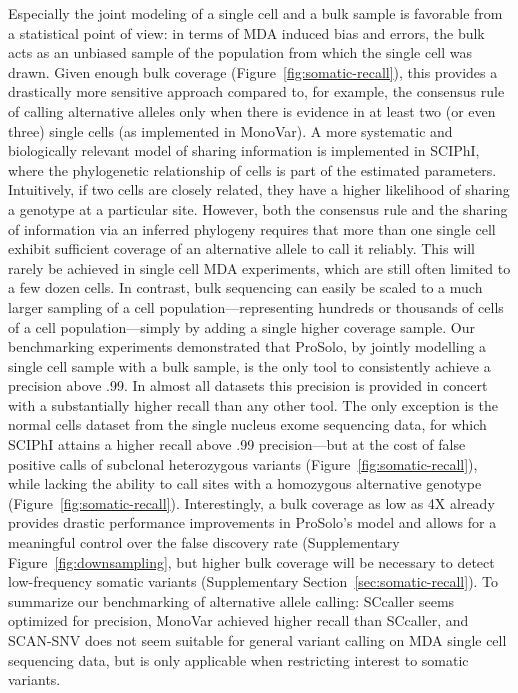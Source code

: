 \documentclass[12pt,inline]{wlscirep}
\begin{document}
Especially the joint modeling of a single cell and a bulk sample is favorable from a statistical point of view: in terms of MDA induced bias and errors, the bulk acts as an unbiased sample of the population from which the single cell was drawn.
Given enough bulk coverage (Figure~\ref{fig:somatic-recall}), this provides a drastically more sensitive approach compared to, for example, the consensus rule of calling alternative alleles only when there is evidence in at least two (or even three) single cells (as implemented in MonoVar\cite{zafar_monovar:_2016}).
A more systematic and biologically relevant model of sharing information is implemented in SCIPhI, where the phylogenetic relationship of cells is part of the estimated parameters.
Intuitively, if two cells are closely related, they have a higher likelihood of sharing a genotype at a particular site.
However, both the consensus rule and the sharing of information via an inferred phylogeny requires that more than one single cell exhibit sufficient coverage of an alternative allele to call it reliably.
This will rarely be achieved in single cell MDA experiments, which are still often limited to a few dozen cells.
In contrast, bulk sequencing can easily be scaled to a much larger sampling of a cell population---representing hundreds or thousands of cells of a cell population---simply by adding a single higher coverage sample.
Our benchmarking experiments demonstrated that ProSolo, by jointly modelling a single cell sample with a bulk sample, is the only tool to consistently achieve a precision above .99.
In almost all datasets this precision is provided in concert with a substantially higher recall than any other tool.
The only exception is the normal cells dataset from the single nucleus exome sequencing data, for which SCIPhI attains a higher recall above .99 precision---but at the cost of false positive calls of subclonal heterozygous variants (Figure~\ref{fig:somatic-recall}), while lacking the ability to call sites with a homozygous alternative genotype (Figure~\ref{fig:somatic-recall}).
Interestingly, a bulk coverage as low as 4X already provides drastic performance improvements in ProSolo's model and allows for a meaningful control over the false discovery rate (Supplementary Figure~\ref{fig:downsampling}, but higher bulk coverage will be necessary to detect low-frequency somatic variants (Supplementary Section~\ref{sec:somatic-recall}).
To summarize our benchmarking of alternative allele calling: SCcaller seems optimized for precision, MonoVar achieved higher recall than SCcaller, and SCAN-SNV does not seem suitable for general variant calling on MDA single cell sequencing data, but is only applicable when restricting interest to somatic variants.
\end{document}
